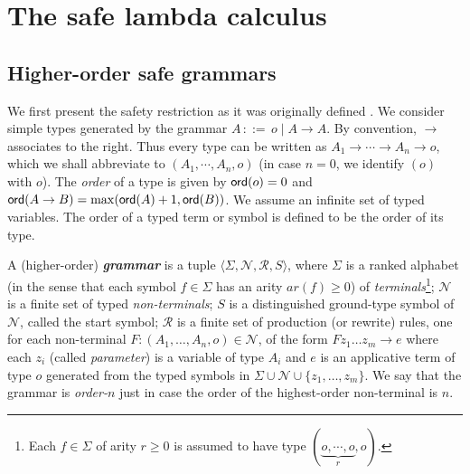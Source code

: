 \documentclass{llncs}
\newcommand\defname[1]{{\bf\em #1}\index{#1}}
\newcommand\ord[1]{{\sf
    ord}(#1)} \newcommand\typear{\rightarrow}
\newcommand\union{\cup}
\begin{document}






\section{The safe lambda calculus}
\label{sec:safe}
\subsection*{Higher-order safe grammars}
We first present the safety restriction as it was originally defined
\cite{KNU02}. We consider simple types generated by the grammar $A \,
::= \, o \; | \; A \typear A$. By convention, $\rightarrow$ associates
to the right. Thus every type can be written as $A_1 \typear \cdots
\typear A_n \typear o$, which we shall abbreviate to $(A_1, \cdots,
A_n, o)$ (in case $n = 0$, we identify $(o)$ with $o$). The
\emph{order} of a type is given by $\ord{o} = 0$ and $\ord{A \typear
  B} = \max(\ord{A}+1, \ord{B})$. We assume an infinite set of typed
variables. The order of a typed term or symbol is defined to be the
order of its type.

A (higher-order) \defname{grammar} is a tuple $\langle
\Sigma, \mathcal{N}, \mathcal{R}, S \rangle$, where $\Sigma$ is a
ranked alphabet (in the sense that each symbol $f \in \Sigma$ has an
arity $\mathit{ar}(f) \geq 0$) of \emph{terminals}\footnote{Each $f \in
  \Sigma$ of arity $r \geq 0$ is assumed to have type $(\underbrace{o,
    \cdots, o}_r, o)$.}; $\mathcal{N}$ is a finite set of typed
\emph{non-terminals}; $S$ is a distinguished ground-type symbol of
$\mathcal{N}$, called the start symbol; $\mathcal{R}$ is a finite set
of production (or rewrite) rules, one for each non-terminal $F : (A_1,
\ldots, A_n, o) \in \mathcal{N}$, of the form $ F z_1 \ldots z_m
\rightarrow e$ where each $z_i$ (called \emph{parameter}) is a
variable of type $A_i$ and $e$ is an applicative term of type $o$
generated from the typed symbols in $\Sigma \union \mathcal{N} \union \{z_1,
\ldots, z_m \}$. We say that the grammar is \emph{order-$n$} just in
case the order of the highest-order non-terminal is $n$.
\end{document}
